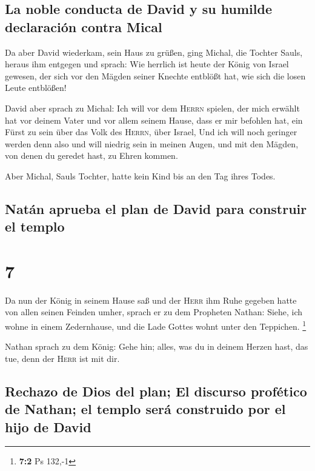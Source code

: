 \hypertarget{la-noble-conducta-de-david-y-su-humilde-declaraciuxf3n-contra-mical}{%
\subsection{La noble conducta de David y su humilde declaración contra
Mical}\label{la-noble-conducta-de-david-y-su-humilde-declaraciuxf3n-contra-mical}}

 Da aber David wiederkam, sein Haus zu grüßen, ging
Michal, die Tochter Sauls, heraus ihm entgegen und sprach: Wie herrlich
ist heute der König von Israel gewesen, der sich vor den Mägden seiner
Knechte entblößt hat, wie sich die losen Leute entblößen!

 David aber sprach zu Michal: Ich will vor dem
\textsc{Herrn} spielen, der mich erwählt hat vor deinem Vater und vor
allem seinem Hause, dass er mir befohlen hat, ein Fürst zu sein über das
Volk des \textsc{Herrn}, über Israel,  Und ich will noch
geringer werden denn also und will niedrig sein in meinen Augen, und mit
den Mägden, von denen du geredet hast, zu Ehren kommen.

 Aber Michal, Sauls Tochter, hatte kein Kind bis an den
Tag ihres Todes.

\hypertarget{natuxe1n-aprueba-el-plan-de-david-para-construir-el-templo}{%
\subsection{Natán aprueba el plan de David para construir el
templo}\label{natuxe1n-aprueba-el-plan-de-david-para-construir-el-templo}}

\hypertarget{section-6}{%
\section{7}\label{section-6}}

 Da nun der König in seinem Hause saß und der
\textsc{Herr} ihm Ruhe gegeben hatte von allen seinen Feinden umher,
 sprach er zu dem Propheten Nathan: Siehe, ich wohne in
einem Zedernhause, und die Lade Gottes wohnt unter den Teppichen.
\footnote{\textbf{7:2} Ps 132,-1}

 Nathan sprach zu dem König: Gehe hin; alles, was du in
deinem Herzen hast, das tue, denn der \textsc{Herr} ist mit dir.

\hypertarget{rechazo-de-dios-del-plan-el-discurso-profuxe9tico-de-nathan-el-templo-seruxe1-construido-por-el-hijo-de-david}{%
\subsection{Rechazo de Dios del plan; El discurso profético de Nathan;
el templo será construido por el hijo de
David}\label{rechazo-de-dios-del-plan-el-discurso-profuxe9tico-de-nathan-el-templo-seruxe1-construido-por-el-hijo-de-david}}

